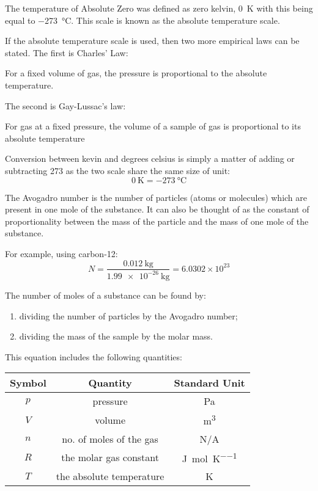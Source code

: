 \documentclass[main.tex]{subfiles}
\begin{document}
The temperature of Absolute Zero was defined as zero kelvin, \SI{0}{\kelvin} with this being equal to \SI{-273}{\celsius}. This scale is known as the absolute temperature scale. 

If the absolute temperature scale is used, then two more empirical laws can be stated. The first is Charles' Law:

\begin{center}
For a fixed volume of gas, the pressure is proportional to the absolute temperature.
\end{center}

The second is Gay-Lussac's law:

\begin{center}
For gas at a fixed pressure, the volume of a sample of gas is proportional to its absolute temperature
\end{center}


Conversion between kevin and degrees celsius is simply a matter of adding or subtracting 273 as the two scale share the same size of unit:
$$ \SI{0}{\kelvin} = \SI{-273}{\celsius}$$


The Avogadro number is the number of particles (atoms or molecules) which are present in one mole of the substance. It can also be thought of as the constant of proportionality between the mass of the particle and the mass of one mole of the substance. 

For example, using carbon-12:
$$ N = \frac{\SI{0.012}{\kilo\gram}}{\SI{1.99e-26}{\kilo\gram}} = 6.0302\times10^{23}$$

The number of moles of a substance can be found by:
\begin{enumerate}
\item dividing the number of particles by the Avogadro number;
\item dividing the mass of the sample by the molar mass.
\end{enumerate}


This equation includes the following quantities:

\begin{center}\begin{tabular}{ccc}
Symbol & Quantity & Standard Unit \\ \hline
$p$ & pressure & \si{\pascal} \\
$V$ & volume & \si{\metre^3} \\
$n$ & no. of moles of the gas & N/A \\
$R$ & the molar gas constant & \si{\joule\per\mole\per\kelvin} \\
$T$ & the absolute temperature & \si{\kelvin} \\
\end{tabular}\end{center}
\end{document}
